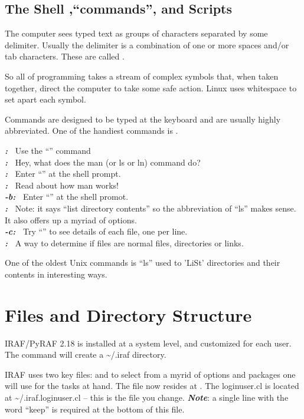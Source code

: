 \documentclass[letter,11pt,oneside]{article}
\newcommand{\dhl}[1]{{\color{verbcolor}{\texttt#1}}}
\newcounter{teachcounter}
\newcommand{\exercise}[1][] {\textbf{\emph{\color{verbcolor}{Exercise} \theteachcounter #1:}~ }}
\newcommand{\example}  {\textbf{\emph{\color{verbcolor}{Example} \theteachcounter :}~ }}
\newcommand{\prose}    {\textbf{\emph{\color{verbcolor}{Prose} \theteachcounter :}~ }}
\newcommand{\takeaway} {\textbf{\emph{\color{verbcolor}{Take Away} \theteachcounter :}~ }}
\begin{document}
\subsection*{The Shell ,``commands'', and Scripts}

The computer sees typed text as groups of characters separated by some
delimiter. Usually the delimiter is a combination of one or more
spaces and/or tab characters. These are called \dhl{whitespace}.

So all of programming takes a stream of complex symbols that, when
taken together, direct the computer to take some safe action. Linux
uses whitespace to set apart each symbol. 

Commands are designed to be typed at the keyboard and are usually
highly abbreviated. One of the handiest commands is \dhl{man}.

\example Use the ``\dhl{man}'' command \\
\prose Hey, what does the man (or ls or ln) command do?\\
\exercise Enter ``\dhl{man man}'' at the shell prompt.\\
\takeaway Read about how man works!\\
\exercise[-b] Enter ``\dhl{man ls}'' at the shell promot.\\
\takeaway Note: it says ``list directory contents'' so the abbreviation
of ``ls'' makes sense. It also offers up a myriad of options.\\
\exercise[-c] Try ``\dhl{ls -l}'' to see details of each file, one per line.\\
\takeaway A way to determine if files are normal files, directories or
links.

One of the oldest Unix commands is ``ls'' used to 'LiSt' directories and
their contents in interesting ways.

\section{Files and Directory Structure}

IRAF/PyRAF 2.18 is installed at a system level, and customized for each user.
The \dhl{mkiraf} command will create a {\textasciitilde}/.iraf directory.

IRAF uses two key files: \dhl{login.cl} and \dhl{loginuser.cl} to select from a myrid
of options and packages one will use for the tasks at hand. The \dhl{login.cl}
file now resides at \dhl{/etc/iraf/login.cl}. The loginuser.cl is located
at {\textasciitilde}/.iraf.loginuser.cl -- this is the file you change.
\textbf{\emph{Note}}: a single line with the word ``keep'' is required at the bottom
of this file.
\end{document}
